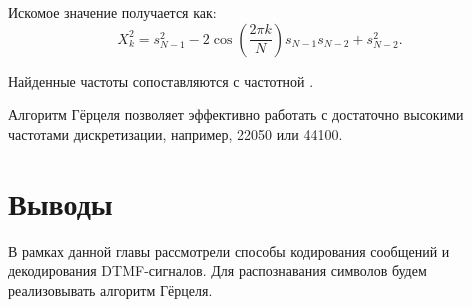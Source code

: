 Искомое значение получается как:
\begin{equation}
	X_{k}^{2}=s_{N-1}^{2}-2\cos \left({\frac {2\pi k}{N}}\right)s_{N-1}s_{N-2}+s_{N-2}^{2}.
\end{equation}	

Найденные частоты сопоставляются с частотной .

Алгоритм Гёрцеля позволяет эффективно работать с достаточно высокими частотами дискретизации, например, 22050 или 44100.

\section{Выводы} \label{ch1:conclusion}

В рамках данной главы рассмотрели способы кодирования сообщений и декодирования DTMF-сигналов. Для распознавания символов будем реализовывать алгоритм Гёрцеля.


%
\newpage %
